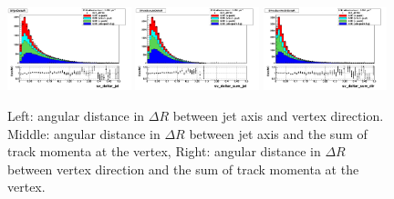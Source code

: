 \begin{figure}[h!]
\centering
\includegraphics[width=0.32\textwidth]{figures/sv_deltar_jet_Linear.png}
\includegraphics[width=0.32\textwidth]{figures/sv_deltar_sum_jet_Linear.png}
\includegraphics[width=0.32\textwidth]{figures/sv_deltar_sum_dir_Linear.png}
\caption{Left: angular distance in $\Delta R$ between jet axis and vertex direction. Middle: angular distance in $\Delta R$ between jet axis and the sum of track momenta at the vertex, Right: angular distance in $\Delta R$ between vertex direction and the sum of track momenta at the vertex. }
\label{fig:vertexAngles}
\end{figure}